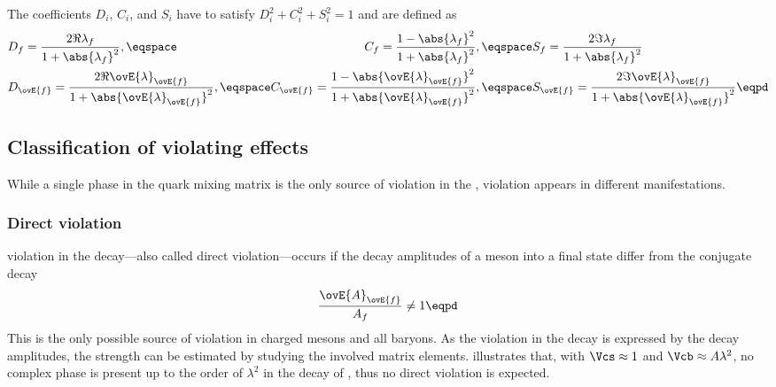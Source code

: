 The \CP coefficients $D_i$, $C_i$, and $S_i$ have to satisfy $D_i^2 + C_i^2 +
S_i^2 = 1$ and are defined as
%
\begin{equation}\label{eq:cpv_theory:flavour_physics:time_evolution:cp_coefficients}
  \begin{alignedat}{2}
    &D_f = \frac{2 \Re \lambda_f}{1+\abs{\lambda_f}^2}, \eqspace 
    &C_f = \frac{1 - \abs{\lambda_f}^2}{1 + \abs{\lambda_f}^2}, \eqspace 
    &S_f = \frac{2 \Im \lambda_f}{1+\abs{\lambda_f}^2} \\
    &D_{\ovE{f}} = \frac{2 \Re \ovE{\lambda}_{\ovE{f}}}{1+\abs{\ovE{\lambda}_{\ovE{f}}}^2}, \eqspace 
    &C_{\ovE{f}} = \frac{1 - \abs{\ovE{\lambda}_{\ovE{f}}}^2}{1 + \abs{\ovE{\lambda}_{\ovE{f}}}^2}, \eqspace 
    &S_{\ovE{f}} = \frac{2 \Im \ovE{\lambda}_{\ovE{f}}}{1+\abs{\ovE{\lambda}_{\ovE{f}}}^2}\eqpd \\
  \end{alignedat}
\end{equation}
%

\subsection[Classification of \CP violating effects]{Classification of \CPbfsf violating effects}
\label{sec:cpv_theory:flavour_physics:cpv_classification}

While a single phase in the \CKM quark mixing matrix is the only source of \CP
violation in the \SM, \CP violation appears in different manifestations.

\subsubsection[Direct \CP violation]{Direct \CPbfsf violation}
\label{sec:cpv_theory:flavour_physics:cpv_classification:direct}

\CP violation in the decay---also called direct \CP violation---occurs if the
decay amplitudes of a meson into a final state differ from the \CP conjugate
decay
%
\begin{equation}
  \frac{\ovE{A}_{\ovE{f}}}{A_f} \neq 1 \eqpd
\end{equation}
%
This is the only possible source of \CP violation in charged mesons and all
baryons. As the \CP violation in the decay is expressed by the decay amplitudes,
the strength can be estimated by studying the involved \CKM matrix elements.
 illustrates that, with $\Vcs \approx 1$ and $\Vcb
\approx A\lambda^2$, no complex phase is present up to the order of $\lambda^2$
in the decay of \BdToJpsiKS, thus no direct \CP violation is expected.

